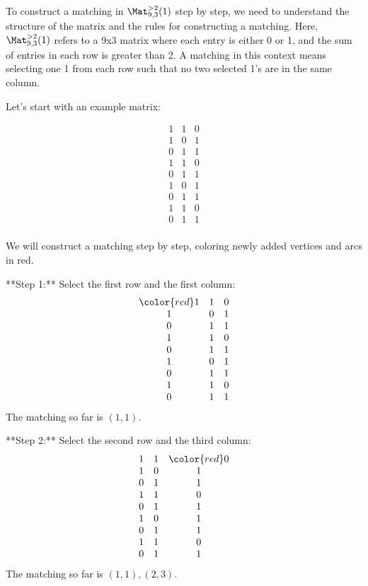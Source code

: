 To construct a matching in \(\Mat_{9,3}^{>2}(1)\) step by step, we need to understand the structure of the matrix and the rules for constructing a matching. Here, \(\Mat_{9,3}^{>2}(1)\) refers to a 9x3 matrix where each entry is either 0 or 1, and the sum of entries in each row is greater than 2. A matching in this context means selecting one 1 from each row such that no two selected 1's are in the same column.

Let's start with an example matrix:

\[
\begin{array}{ccc}
1 & 1 & 0 \\
1 & 0 & 1 \\
0 & 1 & 1 \\
1 & 1 & 0 \\
0 & 1 & 1 \\
1 & 0 & 1 \\
0 & 1 & 1 \\
1 & 1 & 0 \\
0 & 1 & 1 \\
\end{array}
\]

We will construct a matching step by step, coloring newly added vertices and arcs in red.

**Step 1:**
Select the first row and the first column:
\[
\begin{array}{ccc}
\color{red}1 & 1 & 0 \\
1 & 0 & 1 \\
0 & 1 & 1 \\
1 & 1 & 0 \\
0 & 1 & 1 \\
1 & 0 & 1 \\
0 & 1 & 1 \\
1 & 1 & 0 \\
0 & 1 & 1 \\
\end{array}
\]
The matching so far is \((1,1)\).

**Step 2:**
Select the second row and the third column:
\[
\begin{array}{ccc}
1 & 1 & \color{red}0 \\
1 & 0 & 1 \\
0 & 1 & 1 \\
1 & 1 & 0 \\
0 & 1 & 1 \\
1 & 0 & 1 \\
0 & 1 & 1 \\
1 & 1 & 0 \\
0 & 1 & 1 \\
\end{array}
\]
The matching so far is \((1,1), (2,3)\).

